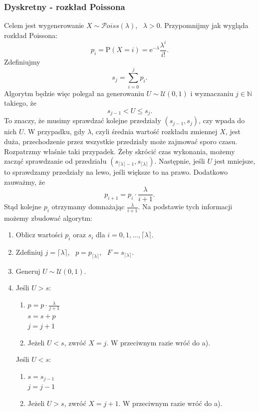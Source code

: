 \documentclass[12pt]{mwrep}
\begin{document}
	\subsubsection{Dyskretny - rozkład Poissona}
	\noindent Celem jest wygenerowanie $X \sim \mathcal{P}oiss(\lambda)$, \ $\lambda > 0$. Przypomnijmy jak wygląda rozkład \mbox{Poissona}:
	$$ p_i = \mathrm{P}(X = i) = \mathrm{e}^{-\lambda} \frac{\lambda^i}{i!}. $$
	Zdefiniujmy
	$$ s_j = \sum\limits_{i=0}^{j} p_i. $$
	Algorytm będzie więc polegał na generowaniu $U \sim \mathcal{U}(0, 1)$ i wyznaczaniu $j \in \mathbb{N} $ takiego, że 
	$$ s_{j -1} < U \leqslant s_j. $$
	To znaczy, że musimy sprawdzać kolejne przedziały $(s_{j-1}, s_j)$, czy wpada do nich $U$. W przypadku, gdy $\lambda$, czyli średnia wartość rozkładu zmiennej $X$, jest duża, przechodzenie przez wszystkie przedziały może zajmować sporo czasu. Rozpatrzmy właśnie taki przypadek. Żeby skrócić czas wykonania, możemy zacząć sprawdzanie od przedziału $ (s_{\lceil \lambda \rceil -1}, s_{\lceil \lambda \rceil}) $. Następnie, jeśli $U$ jest mniejsze, to sprawdzamy przedziały na lewo, jeśli większe to na prawo. Dodatkowo zauważmy, że
	$$ p_{i + 1} = p_i \cdot \frac{\lambda}{i + 1}. $$
	Stąd kolejne $p_i$ otrzymamy domnażając $\frac{\lambda}{i + 1}$. Na podstawie tych informacji możemy zbudować algorytm:
	\begin{enumerate}[leftmargin=10mm]
		\item Oblicz wartości $p_i$ oraz $s_i$ dla $i = 0, 1, \dots, \lceil\lambda\rceil$.
		\item Zdefiniuj $j = \lceil \lambda \rceil$, \ $p = p_{\lceil\lambda\rceil}$, \ $F = s_{\lceil\lambda\rceil}$.
		\item Generuj $U \sim \mathcal{U}(0, 1)$.
		\item Jeśli $U > s$:
		\begin{enumerate}[leftmargin=10mm]
			\item $p = p \cdot \frac{\lambda}{j+1}$\\
			$s = s + p$\\
			$j = j + 1$
			\item Jeżeli $U < s$, zwróć $X = j$. W przeciwnym razie wróć do a).
		\end{enumerate}
		\vspace{2mm}
		Jeśli $U < s$:
		\begin{enumerate}[leftmargin=10mm]
			\item $s = s_{j-1}$\\
			$j = j - 1$
			\item Jeżeli $U > s$, zwróć $X = j + 1$. W przeciwnym razie wróć do a).
		\end{enumerate}
	\end{enumerate}
\end{document}

